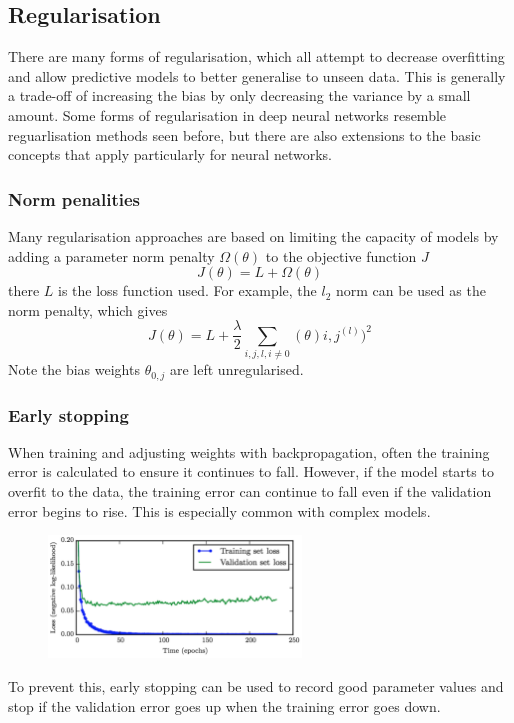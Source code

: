 \documentclass[CS5104-Notes.tex]{subfiles}
\begin{document}
\subsection{Regularisation}
There are many forms of regularisation, which all attempt to decrease overfitting and allow predictive models to better generalise to unseen data. This is generally a trade-off of increasing the bias by only decreasing the variance by a small amount. Some forms of regularisation in deep neural networks resemble reguarlisation methods seen before, but there are also extensions to the basic concepts that apply particularly for neural networks.

\subsubsection{Norm penalities}
Many regularisation approaches are based on limiting the capacity of models by adding a parameter norm penalty $\Omega(\theta)$ to the objective function $J$
\begin{equation}
J(\theta) = L + \Omega(\theta)
\end{equation}
there $L$ is the loss function used. For example, the $l_{2}$ norm can be used as the norm penalty, which gives
\begin{equation}
J(\theta) = L + \frac{\lambda}{2}\sum_{i,j,l,i \neq 0}(\theta){i,j}^{(l)})^{2}
\end{equation}
Note the bias weights $\theta_{0,j}$ are left unregularised.

\subsubsection{Early stopping}
When training and adjusting weights with backpropagation, often the training error is calculated to ensure it continues to fall. However, if the model starts to overfit to the data, the training error can continue to fall even if the validation error begins to rise. This is especially common with complex models.
\begin{figure}[H]
  \centering
  \includegraphics[width=0.6\textwidth, keepaspectratio]{imgs/early-stopping.png}
\end{figure}
\noindent
To prevent this, early stopping can be used to record good parameter values and stop if the validation error goes up when the training error goes down. 
\end{document}
